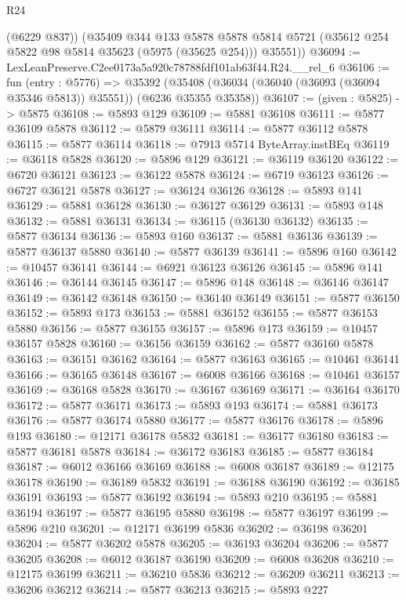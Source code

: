 \begin{lexlean}{R24}
\begin{coremodule}
        (@6229 @837))
      (@35409
        @344
        @133
        @5878
        @5878
        @5814
        @5721
        (@35612 @254 @5822 @98 @5814 @35623 (@5975 (@35625 @254)))
        @35551))
@36094 := LexLeanPreserve.C2ee0173a5a920c78788fdf101ab63f44.R24.__rel_6
@36106 := fun (entry : @5776) =>
  @35392 (@35408 (@36034 (@36040 (@36093 (@36094 @35346 @5813)) @35551)) (@6236 @35355 @35358))
@36107 := (given : @5825) -> @5875
@36108 := @5893 @129
@36109 := @5881 @36108
@36111 := @5877 @36109 @5878
@36112 := @5879 @36111
@36114 := @5877 @36112 @5878
@36115 := @5877 @36114
@36118 := @7913 @5714 ByteArray.instBEq
@36119 := @36118 @5828
@36120 := @5896 @129
@36121 := @36119 @36120
@36122 := @6720 @36121
@36123 := @36122 @5878
@36124 := @6719 @36123
@36126 := @6727 @36121 @5878
@36127 := @36124 @36126
@36128 := @5893 @141
@36129 := @5881 @36128
@36130 := @36127 @36129
@36131 := @5893 @148
@36132 := @5881 @36131
@36134 := @36115 (@36130 @36132)
@36135 := @5877 @36134
@36136 := @5893 @160
@36137 := @5881 @36136
@36139 := @5877 @36137 @5880
@36140 := @5877 @36139
@36141 := @5896 @160
@36142 := @10457 @36141
@36144 := @6921 @36123 @36126
@36145 := @5896 @141
@36146 := @36144 @36145
@36147 := @5896 @148
@36148 := @36146 @36147
@36149 := @36142 @36148
@36150 := @36140 @36149
@36151 := @5877 @36150
@36152 := @5893 @173
@36153 := @5881 @36152
@36155 := @5877 @36153 @5880
@36156 := @5877 @36155
@36157 := @5896 @173
@36159 := @10457 @36157 @5828
@36160 := @36156 @36159
@36162 := @5877 @36160 @5878
@36163 := @36151 @36162
@36164 := @5877 @36163
@36165 := @10461 @36141
@36166 := @36165 @36148
@36167 := @6008 @36166
@36168 := @10461 @36157
@36169 := @36168 @5828
@36170 := @36167 @36169
@36171 := @36164 @36170
@36172 := @5877 @36171
@36173 := @5893 @193
@36174 := @5881 @36173
@36176 := @5877 @36174 @5880
@36177 := @5877 @36176
@36178 := @5896 @193
@36180 := @12171 @36178 @5832
@36181 := @36177 @36180
@36183 := @5877 @36181 @5878
@36184 := @36172 @36183
@36185 := @5877 @36184
@36187 := @6012 @36166 @36169
@36188 := @6008 @36187
@36189 := @12175 @36178
@36190 := @36189 @5832
@36191 := @36188 @36190
@36192 := @36185 @36191
@36193 := @5877 @36192
@36194 := @5893 @210
@36195 := @5881 @36194
@36197 := @5877 @36195 @5880
@36198 := @5877 @36197
@36199 := @5896 @210
@36201 := @12171 @36199 @5836
@36202 := @36198 @36201
@36204 := @5877 @36202 @5878
@36205 := @36193 @36204
@36206 := @5877 @36205
@36208 := @6012 @36187 @36190
@36209 := @6008 @36208
@36210 := @12175 @36199
@36211 := @36210 @5836
@36212 := @36209 @36211
@36213 := @36206 @36212
@36214 := @5877 @36213
@36215 := @5893 @227

\end{coremodule}
\end{lexlean}
